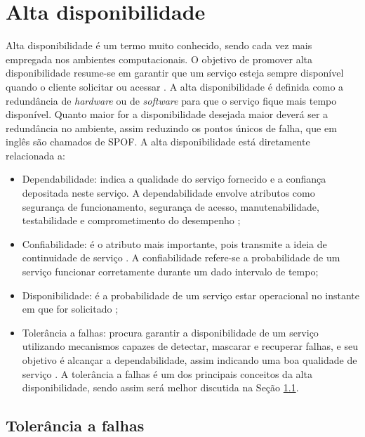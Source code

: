 \chapter{Alta disponibilidade}
\label{cap:altadisponibilidade}

Alta disponibilidade é um termo muito conhecido, sendo cada vez mais empregada nos ambientes computacionais. O objetivo de promover 
alta disponibilidade resume-se em garantir que um serviço esteja sempre disponível quando o cliente solicitar ou acessar \cite{costa2009}.
A alta disponibilidade é definida como a redundância de \textit{hardware} ou de \textit{software} para que o serviço fique mais tempo disponível.
Quanto maior for a disponibilidade desejada maior deverá ser a redundância no ambiente, assim reduzindo os pontos únicos de falha,
que em inglês são chamados de \ac{SPOF}. A alta disponibilidade está diretamente relacionada a: 
\begin{itemize}
 \item Dependabilidade: indica a qualidade do serviço fornecido e a confiança depositada neste serviço. A dependabilidade envolve atributos 
 como segurança de funcionamento, segurança de acesso, manutenabilidade, testabilidade e comprometimento do desempenho \cite{weber2002};
 \item Confiabilidade: é o atributo mais importante, pois transmite a ideia de continuidade de serviço \cite{pankaj1994}. A confiabilidade 
 refere-se a probabilidade de um serviço funcionar corretamente durante um dado intervalo de tempo;
 \item Disponibilidade: é a probabilidade de um serviço estar operacional no instante em que for solicitado \cite{costa2009};
 \item Tolerância a falhas: procura garantir a disponibilidade de um serviço utilizando mecanismos capazes de detectar, mascarar e recuperar 
 falhas, e seu objetivo é alcançar a dependabilidade, assim indicando uma boa qualidade de serviço \cite{costa2009}. A tolerância a falhas é 
 um dos principais conceitos da alta disponibilidade, sendo assim será melhor discutida na Seção \ref{section:toleranciafalhas}.
\end{itemize}

\section{Tolerância a falhas}
\label{section:toleranciafalhas}

